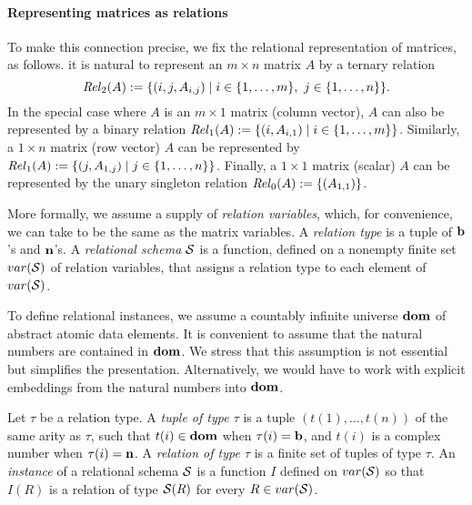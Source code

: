 \paragraph{Representing matrices as relations}
To make this connection precise, we fix the relational representation of matrices, as follows. it is natural to represent an $m \times n$ matrix $A$
by a ternary relation $$
\mathit{Rel}_2(A) := \{(i,j,A_{i,j}) \mid i \in \{1,\dots,m\}, \ j \in
\{1,\dots,n\}\}. $$  In the special case where $A$ is an
$m \times 1$ matrix (column
vector), $A$ can also be represented by a binary relation
$\mathit{Rel}_1(A) :=
\{(i,A_{i,1}) \mid i \in \{1,\dots,m\}\}$.  Similarly, a $1
\times n$ matrix (row vector) $A$ can be represented by $\mathit{Rel}_1(A)
:= \{(j,A_{1,j}) \mid j \in \{1,\dots,n\}\}$.  Finally, a $1
\times 1$ matrix (scalar) $A$ can be represented by the unary
singleton relation $\mathit{Rel}_0(A) := \{(A_{1,1})\}$. 

More formally,
we assume a supply of \emph{relation variables}, which, for
convenience, we can take to be the same as the matrix variables.
A \emph{relation type} is a tuple of $\mathbf{b}$'s and $\mathbf{n}$'s.
A \emph{relational schema} $\mathcal{S}$ is a function, defined on a
nonempty finite set
$var(\mathcal{S})$ of relation variables, that assigns a relation type
to each element of $var(\mathcal{S})$.

To define relational instances, we assume a countably infinite universe
$\mathbf{dom}$ of abstract atomic data elements.  It is convenient to
assume that the natural numbers are contained in $\mathbf{dom}$.  We
stress that this assumption is not essential but simplifies the
presentation.  Alternatively, we would have to work with explicit
embeddings from the natural numbers into $\mathbf{dom}$.

Let $\tau$ be a relation type. A \emph{tuple
of type $\tau$} is a tuple $(t(1),\dots,t(n))$ of the same arity
as $\tau$, such that $t(i) \in \mathbf{dom}$ when $\tau(i) = \mathbf{b}$, and
$t(i)$ is a complex number when $\tau(i) = \mathbf{n}$.
A \emph{relation of type
$\tau$} is a finite set of tuples of type $\tau$.  
An \emph{instance} of a relational schema $\mathcal{S}$ is a
function $I$ defined on $var(\mathcal{S})$ so that $I(R)$ is a relation
of type $\mathcal{S}(R)$ for every $R \in var(\mathcal{S})$.

